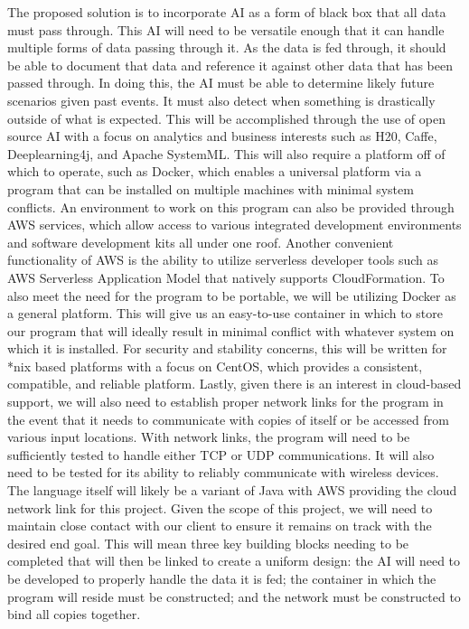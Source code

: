 \documentclass[onecolumn, draftclsnofoot,10pt, compsoc]{IEEEtran}
\begin{document}
	The proposed solution is to incorporate AI as a form of black box that all data must pass through. This AI will need to be versatile enough that it can handle multiple forms of data passing through it. As the data is fed through, it should be able to document that data and reference it against other data that has been passed through. In doing this, the AI must be able to determine likely future scenarios given past events. It must also detect when something is drastically outside of what is expected. This will be accomplished through the use of open source AI with a focus on analytics and business interests such as H20, Caffe, Deeplearning4j, and Apache SystemML. This will also require a platform off of which to operate, such as Docker, which enables a universal platform via a program that can be installed on multiple machines with minimal system conflicts. An environment to work on this program can also be provided through AWS services, which allow access to various integrated development environments and software development kits all under one roof. Another convenient functionality of AWS is the ability to utilize serverless developer tools such as AWS Serverless Application Model that natively supports CloudFormation. To also meet the need for the program to be portable, we will be utilizing Docker as a general platform. This will give us an easy-to-use container in which to store our program that will ideally result in minimal conflict with whatever system on which it is installed. For security and stability concerns, this will be written for *nix based platforms with a focus on CentOS, which provides a consistent, compatible, and reliable platform. Lastly, given there is an interest in cloud-based support, we will also need to establish proper network links for the program in the event that it needs to communicate with copies of itself or be accessed from various input locations. With network links, the program will need to be sufficiently tested to handle either TCP or UDP communications. It will also need to be tested for its ability to reliably communicate with wireless devices. The language itself will likely be a variant of Java with AWS providing the cloud network link for this project. Given the scope of this project, we will need to maintain close contact with our client to ensure it remains on track with the desired end goal. This will mean three key building blocks needing to be completed that will then be linked to create a uniform design: the AI will need to be developed to properly handle the data it is fed; the container in which the program will reside must be constructed; and the network must be constructed to bind all copies together.
	
\end{document}
